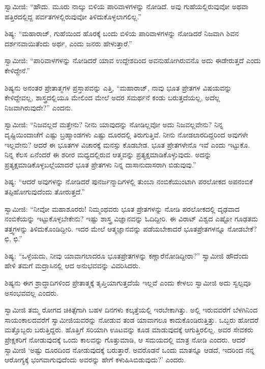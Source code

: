  ಸ್ವಾಮೀಜಿ: “ಹೌದು. ಮೂರು ನಾಲ್ಕು ಬಿಳಿಯ ಪಾರಿವಾಳಗಳನ್ನು ನೋಡಿದೆ. ಅವು ಗುಹೆಯಲ್ಲಿರುವುವೋ ಅಥವಾ ಹತ್ತಿರದಲ್ಲಿದ್ದ ಪರ್ವತಗಳಲ್ಲಿರುವುವೋ‌ ತಿಳಿದುಕೊಳ್ಳಲಾಗಲಿಲ್ಲ.” 

 ಶಿಷ್ಯ: “ಮಹಾರಾಜ್, ಗುಹೆಯಿಂದ ಹೊರಕ್ಕೆ ಬಂದು ಬಿಳಿಯ ಪಾರಿವಾಳಗಳನ್ನು ನೋಡಿದರೆ ನಿಜವಾಗಿ ಶಿವನ ದರ್ಶನವಾಯಿತೆಂದು ಅರ್ಥ, ಎಂದು ಜನರು ಹೇಳುತ್ತಾರೆ.” 

 ಸ್ವಾಮೀಜಿ: “ಪಾರಿವಾಳಗಳನ್ನು ನೋಡಿದರೆ ಯಾವ ಉದ್ದೇಶದಿಂದ ಅವನು\break ಹೋಗಿರುವನೊ ಅದು ಈಡೇರುತ್ತದೆ ಎಂದು ಕೇಳಿದ್ದೇನೆ.” 

 ಶಿಷ್ಯನು ಅನಂತರ ಪ್ರೇತಾತ್ಮಗಳ ಪ್ರಸ್ತಾಪವನ್ನು ಎತ್ತಿ, “ಮಹಾರಾಜ್, ನಾವು ಭೂತ ಪ್ರೇತಗಳ ವಿಷಯವನ್ನು ಕೇಳಿದ್ದೇವಲ್ಲ, ಶಾಸ್ತ್ರದಲ್ಲಿಯೂ ಮೇಲಿಂದ ಮೇಲೆ ಅದರ ಸಮರ್ಥನೆ ಕಂಡು ಬರುತ್ತದೆಯಲ್ಲ, ಅದೆಲ್ಲ ನಿಜವಾಗಿರುವುದೇ?” ಎಂದನು. 

 ಸ್ವಾಮೀಜಿ: “ನಿಜವಲ್ಲದೆ ಮತ್ತೇನು? ನೀನು ಯಾವುದನ್ನು ನೋಡಿಲ್ಲವೋ ಅದು ನಿಜವಲ್ಲವೇನು? ನಿನ್ನ ದೃಷ್ಟಿಯಿಂದಾಚೆಗೆ ಎಷ್ಟು ಬ್ರಹ್ಮಾಂಡಗಳು ಎಷ್ಟು ದೂರದಲ್ಲಿ ತಿರುಗುತ್ತಿವೆ. ನೀನು ನೋಡಲಾರದಿದ್ದರಿಂದ ಅವುಗಳೇ ಇಲ್ಲವೇನು? ಆದರೆ ಈ ಭೂತಗಳ ವಿಚಾರಕ್ಕೆ ಮನಸ್ಸು ಕೊಡಬೇಡ. ಭೂತ ಪ್ರೇತಗಳೇನೊ ಇವೆ ಎಂದು ಇಟ್ಟುಕೊ. ನಿನ್ನ ಕೆಲಸ ಏನೆಂದರೆ ಈ ಶರೀರ ಮಧ್ಯದಲ್ಲಿರುವ ಆತ್ಮವನ್ನು ಪ್ರತ್ಯಕ್ಷಮಾಡಿಕೊಳ್ಳುವುದು. ಅದನ್ನು ಪ್ರತ್ಯಕ್ಷಮಾಡಿಕೊಳ್ಳಬಲ್ಲೆಯಾದರೆ ಭೂತ ಪ್ರೇತಗಳು ನಿನ್ನ ದಾಸಾನುದಾಸರಾಗಿ ಬಿಡುವುವು.” 

 ಶಿಷ್ಯ: “ಆದರೆ ಅವುಗಳನ್ನು ನೋಡಿದರೆ ಪುನರ್ಜನ್ಮಾದಿಗಳಲ್ಲಿ ತುಂಬಾ ನಂಬಿಕೆಯುಂಟಾಗಿ ಪರಲೋಕದ ಅಪನಂಬಿಕೆ ತಪ್ಪಿಹೋಗುವುದೆಂದು ತೋರುತ್ತದೆ.” 

 ಸ್ವಾಮೀಜಿ: “ನೀವೋ ಮಹಾಶೂರರು! ನಿಮ್ಮಂಥವರು ಭೂತ ಪ್ರೇತಗಳನ್ನು ನೋಡಿ ಪರಲೋಕದಲ್ಲಿ ದೃಢವಾದ ನಂಬಿಕೆಯನ್ನು ಇಟ್ಟುಕೊಳ್ಳಬೇಕೇನು? ಇಷ್ಟು ಶಾಸ್ತ್ರ ವಿಜ್ಞಾನವನ್ನು ಓದಿದ್ದೀರಿ. ಈ ವಿರಾಟ್ ವಿಶ್ವದ ಎಷ್ಟೋ ಗೂಢತಮ ತತ್ತ್ವಗಳನ್ನು ತಿಳಿದುಕೊಂಡಿದ್ದೀರಿ. ಇದರ ಮೇಲೆ ಆತ್ಮಜ್ಞಾನವನ್ನು ಪಡೆಯಬೇಕಾದರೆ ಭೂತಪ್ರೇತಗಳನ್ನೂ ನೋಡಬೇಕೆ? ಛಿ, ಛಿ.” 

 ಶಿಷ್ಯ: “ಒಳ್ಳೆಯದು, ನೀವು ಯಾವಾಗಲಾದರೂ ಭೂತಪ್ರೇತಗಳನ್ನು ಕಣ್ಣಾರೆ\break ನೋಡಿದ್ದೀರಾ?” ಸ್ವಾಮೀಜಿ ಹೌದೆಂದು ಹೇಳಿ ತಮಗೆ ಮದ್ರಾಸಿನಲ್ಲಿ ಆದ ಅನುಭವವನ್ನು ವಿವರಿಸಿದರು. 

 ಶಿಷ್ಯನು ಈಗ ಶ್ರಾದ್ಧಾದಿಗಳಿಂದ ಪ್ರೇತಾತ್ಮಕ್ಕೆ ತೃಪ್ತಿಯಾಗುತ್ತದೆಯೆ ಇಲ್ಲವೆ ಎಂದು ಕೇಳಲು ಸ್ವಾಮೀಜಿ ಅದು ಸ್ವಲ್ಪವೂ ಅಸಂಭವವಲ್ಲ ಎಂದರು. 

 ಸ್ವಾಮೀಜಿ ತಮ್ಮ ರೋಗದ ಚಿಕಿತ್ಸೆಗಾಗಿ ಬಹಳ ದಿನಗಳು ಕಲ್ಕತ್ತೆಯಲ್ಲಿ ಇರಬೇಕಾಗಿತ್ತು. ಅಲ್ಲಿ ಇರುವವರೆಗೆ ಬೆಳಗಿನಿಂದ ಸಾಯಂಕಾಲದವರೆಗೆ ಸ್ವಾಮೀಜಿಯವರನ್ನು ನೋಡುವ ತಂಡ ಯಾವಾಗಲೂ ಕಾದುಕೊಂಡಿರುತ್ತಿತ್ತು. ಒಬ್ಬರು ಹೋದರೆ ಮತ್ತೊಬ್ಬರು ಬರುತ್ತಿದ್ದರು. ಹೊತ್ತಿಗೆ ಸರಿಯಾಗಿ ಊಟವನ್ನು ಕೂಡ ಮಾಡುವುದಕ್ಕೆ ಆಗುತ್ತಿರಲಿಲ್ಲ. ಅವರ ಸೇವಕರು ಪ್ರೇಕ್ಷಕರಿಗೆ ನೋಡುವುದಕ್ಕೆ ಒಂದು ಕಾಲವನ್ನು ಗೊತ್ತುಮಾಡಿ, ಆ ಸಮಯದಲ್ಲಿ ಮಾತ್ರ ನೋಡಿ ಎಂದರು. ಆದರೆ ಸ್ವಾಮೀಜಿ ‘ಅಷ್ಟು ದೂರದಿಂದ ನೋಡುವುದಕ್ಕೆ ಬರುತ್ತಾರೆ. ಅವರೊಡನೆ ಒಂದು ಮಾತನ್ನೂ ಆಡದೆ, ಇದರಿಂದ ನನ್ನ ಆರೋಗ್ಯಕ್ಕೆ ಭಂಗವಾಗುವುದೆಂದು ಅವರನ್ನು ಹೇಗೆ ಕಳುಹಿಸಿಬಿಡುವುದು?’ ಎಂದರು. 

